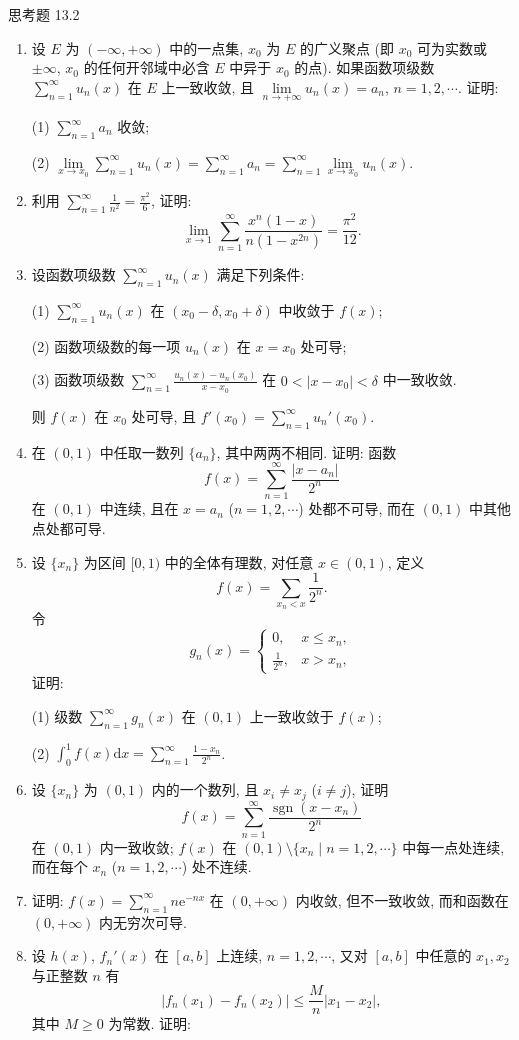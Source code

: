\begin{exblock}{思考题 13.2}
\begin{enumerate}
  \item 设 $E$ 为 $(-\infty,+\infty)$ 中的一点集, $x_{0}$ 为 $E$ 的广义聚点 (即 $x_{0}$ 可为实数或 $\pm\infty$, $x_{0}$ 的任何开邻域中必含 $E$ 中异于 $x_{0}$ 的点). 如果函数项级数 $\sum_{n=1}^{\infty}u_{n}(x)$ 在 $E$ 上一致收敛, 且 $\lim\limits_{n\to+\infty}u_{n}(x)=a_{n}$, $n=1,2,\cdots$. 证明:

  (1) $\sum_{n=1}^{\infty}a_{n}$ 收敛;

  (2) $\lim\limits_{x\to x_{0}}\sum_{n=1}^{\infty}u_{n}(x)=\sum_{n=1}^{\infty}a_{n}=\sum_{n=1}^{\infty}\lim\limits_{x\to x_{0}}u_{n}(x)$.
  \item 利用 $\sum_{n=1}^{\infty}\frac{1}{n^{2}}=\frac{\pi^{2}}{6}$, 证明:
  \[
    \lim_{x\to1}\sum_{n=1}^{\infty}\frac{x^{n}(1-x)}{n(1-x^{2n})}=\frac{\pi^{2}}{12}.
\]
  \item 设函数项级数 $\sum_{n=1}^{\infty}u_{n}(x)$ 满足下列条件:

  (1) $\sum_{n=1}^{\infty}u_{n}(x)$ 在 $(x_{0}-\delta,x_{0}+\delta)$ 中收敛于 $f(x)$;

  (2) 函数项级数的每一项 $u_{n}(x)$ 在 $x=x_{0}$ 处可导;

  (3) 函数项级数 $\sum_{n=1}^{\infty}\frac{u_{n}(x)-u_{n}(x_{0})}{x-x_{0}}$ 在 $0<|x-x_{0}|<\delta$ 中一致收敛.

  则 $f(x)$ 在 $x_{0}$ 处可导, 且 $f'(x_{0})=\sum_{n=1}^{\infty}u_{n}'(x_{0})$.
  \item 在 $(0,1)$ 中任取一数列 $\{a_{n}\}$, 其中两两不相同. 证明: 函数
  \[
    f(x)=\sum_{n=1}^{\infty}\frac{|x-a_{n}|}{2^{n}}
\]
  在 $(0,1)$ 中连续, 且在 $x=a_{n}$ ($n=1,2,\cdots$) 处都不可导, 而在 $(0,1)$ 中其他点处都可导.
  \item 设 $\{x_{n}\}$ 为区间 $[0,1)$ 中的全体有理数, 对任意 $x\in(0,1)$, 定义
  \[
    f(x)=\sum_{x_{n}<x}\frac{1}{2^{n}}.
\]
  令
  \[
    g_{n}(x)=\begin{cases}
      0, & x\leqslant x_{n},\\
      \frac{1}{2^{n}}, & x>x_{n},
\end{cases}
\]
  证明:

  (1) 级数 $\sum_{n=1}^{\infty}g_{n}(x)$ 在 $(0,1)$ 上一致收敛于 $f(x)$;

  (2) $\int_{0}^{1}f(x)\mathrm{d}x=\sum_{n=1}^{\infty}\frac{1-x_{n}}{2^{n}}$.
  \item 设 $\{x_{n}\}$ 为 $(0,1)$ 内的一个数列, 且 $x_{i}\neq x_{j}$ ($i\neq j$), 证明
  \[
    f(x)=\sum_{n=1}^{\infty}\frac{\operatorname{sgn}(x-x_{n})}{2^{n}}
\]
  在 $(0,1)$ 内一致收敛; $f(x)$ 在 $(0,1)\setminus\{x_{n}\mid n=1,2,\cdots\}$ 中每一点处连续, 而在每个 $x_{n}$ ($n=1,2,\cdots$) 处不连续.
  \item 证明: $f(x)=\sum_{n=1}^{\infty}n\mathrm{e}^{-nx}$ 在 $(0,+\infty)$ 内收敛, 但不一致收敛, 而和函数在 $(0,+\infty)$ 内无穷次可导.
  \item 设 $h(x)$, $f_{n}'(x)$ 在 $[a,b]$ 上连续, $n=1,2,\cdots$, 又对 $[a,b]$ 中任意的 $x_{1},x_{2}$ 与正整数 $n$ 有
  \[
    \left|f_{n}(x_{1})-f_{n}(x_{2})\right|\leqslant\frac{M}{n}|x_{1}-x_{2}|,
\]
  其中 $M\geqslant0$ 为常数. 证明:


\end{enumerate}
\end{exblock}
